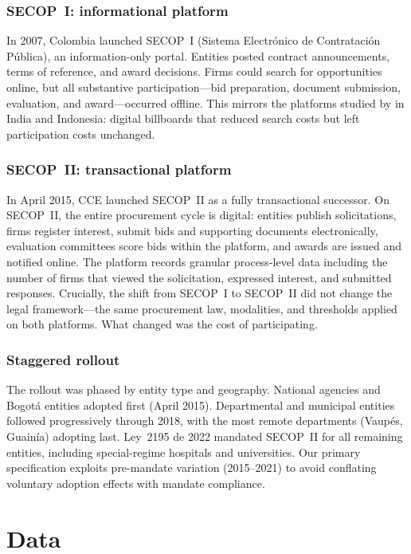 \documentclass[12pt]{article}
\begin{document}
\subsubsection*{SECOP~I: informational platform} In 2007, Colombia launched SECOP~I (Sistema Electr\'{o}nico de Contrataci\'{o}n P\'{u}blica), an information-only portal. Entities posted contract announcements, terms of reference, and award decisions. Firms could search for opportunities online, but all substantive participation---bid preparation, document submission, evaluation, and award---occurred offline. This mirrors the platforms studied by \citet{lewis2016} in India and Indonesia: digital billboards that reduced search costs but left participation costs unchanged.

\subsubsection*{SECOP~II: transactional platform} In April 2015, CCE launched SECOP~II as a fully transactional successor. On SECOP~II, the entire procurement cycle is digital: entities publish solicitations, firms register interest, submit bids and supporting documents electronically, evaluation committees score bids within the platform, and awards are issued and notified online. The platform records granular process-level data including the number of firms that viewed the solicitation, expressed interest, and submitted responses. Crucially, the shift from SECOP~I to SECOP~II did not change the legal framework---the same procurement law, modalities, and thresholds applied on both platforms. What changed was the cost of participating.

\subsubsection*{Staggered rollout} The rollout was phased by entity type and geography. National agencies and Bogot\'{a} entities adopted first (April 2015). Departmental and municipal entities followed progressively through 2018, with the most remote departments (Vaup\'{e}s, Guain\'{i}a) adopting last. Ley~2195 de 2022 mandated SECOP~II for all remaining entities, including special-regime hospitals and universities. Our primary specification exploits pre-mandate variation (2015--2021) to avoid conflating voluntary adoption effects with mandate compliance.


\section{Data}
\label{sec:data}
\end{document}
